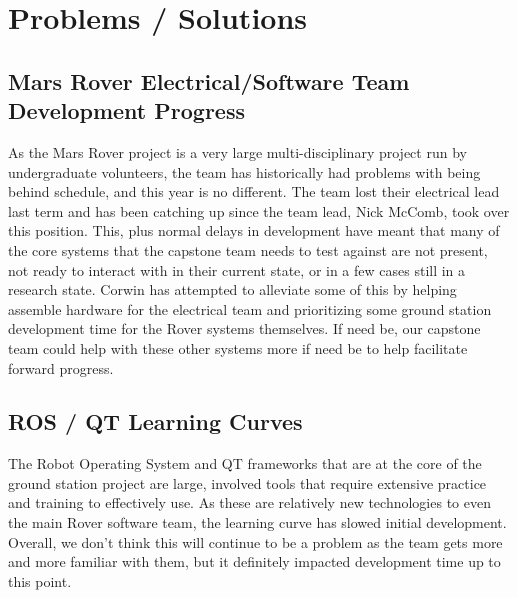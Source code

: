 \section{Problems / Solutions}
\subsection{Mars Rover Electrical/Software Team Development Progress}
As the Mars Rover project is a very large multi-disciplinary project run by undergraduate volunteers, the team has historically had problems with being behind schedule, and this year is no different. The team lost their electrical lead last term and has been catching up since the team lead, Nick McComb, took over this position. This, plus normal delays in development have meant that many of the core systems that the capstone team needs to test against are not present, not ready to interact with in their current state, or in a few cases still in a research state. Corwin has attempted to alleviate some of this by helping assemble hardware for the electrical team and prioritizing some ground station development time for the Rover systems themselves. If need be, our capstone team could help with these other systems more if need be to help facilitate forward progress.


\subsection{ROS / QT Learning Curves}
The Robot Operating System and QT frameworks that are at the core of the ground station project are large, involved tools that require extensive practice and training to effectively use. As these are relatively new technologies to even the main Rover software team, the learning curve has slowed initial development. Overall, we don't think this will continue to be a problem as the team gets more and more familiar with them, but it definitely impacted development time up to this point.
